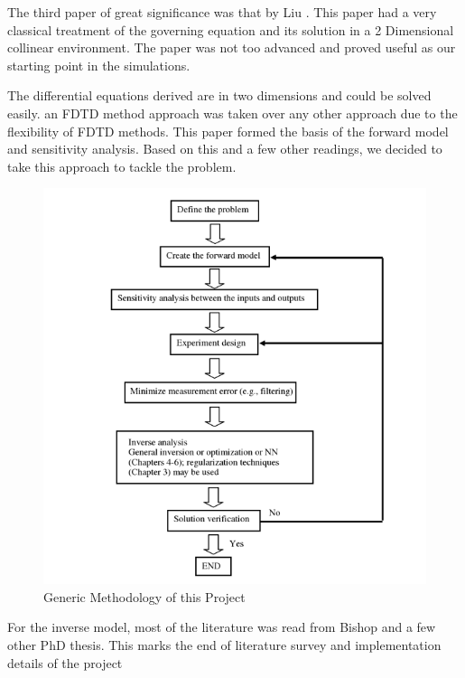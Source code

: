 The third paper of great significance was that by Liu \cite{Liu}. This paper had a very classical treatment of the governing equation and its solution in a 2 Dimensional collinear environment. The paper was not too advanced and proved useful as our starting point in the simulations. 

The differential equations derived are in two dimensions and could be solved easily. an FDTD method approach was taken over any other approach due to the flexibility of FDTD methods. This paper formed the basis of the forward model and sensitivity analysis. Based on this and a few other readings, we decided to take this approach to tackle the problem.

\begin{figure}
\begin{center}
\includegraphics[scale=1]
{images/chapter_2/mthodology_generic.png}
\caption{Generic Methodology of this Project}
\end{center}
\end{figure}

For the inverse model, most of the literature was read from Bishop \cite{bishop} and a few other PhD thesis. This marks the end of literature survey and implementation details of the project